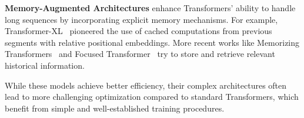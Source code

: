 \textbf{Memory-Augmented Architectures} enhance Transformers' ability to handle long sequences by incorporating explicit memory mechanisms. For example, Transformer-XL~\cite{transformer-xl} pioneered the use of cached computations from previous segments with relative positional embeddings. More recent works like Memorizing Transformers~\cite{memorizingtransformers} and Focused Transformer~\cite{focusedtransformer} try to store and retrieve relevant historical information.

While these models achieve better efficiency, their complex architectures often lead to more challenging optimization compared to standard Transformers, which benefit from simple and well-established training procedures.






